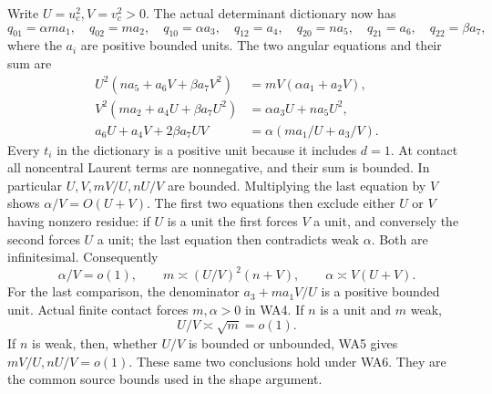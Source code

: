 Write \(U=u_c^2,V=v_c^2>0\). The actual determinant dictionary now has
\[
 q_{01}=\alpha m a_1,\quad q_{02}=ma_2,\quad
 q_{10}=\alpha a_3,\quad q_{12}=a_4,\quad
 q_{20}=na_5,\quad q_{21}=a_6,\quad q_{22}=\beta a_7,
 \tag{WA3}
\]
where the \(a_i\) are positive bounded units. The two angular equations
and their sum are
\[
\begin{aligned}
 U^2(na_5+a_6V+\beta a_7V^2)&=mV(\alpha a_1+a_2V),\\
 V^2(ma_2+a_4U+\beta a_7U^2)&=\alpha a_3U+na_5U^2,\\
 a_6U+a_4V+2\beta a_7UV
 &=\alpha(ma_1/U+a_3/V).
\end{aligned}\tag{WA4}
\]
Every \(t_i\) in the dictionary is a positive unit because it includes
\(d=1\). At contact all noncentral Laurent terms are nonnegative,
and their sum is bounded. In particular \(U,V,mV/U,nU/V\) are bounded.
Multiplying the last equation by \(V\) shows
\(\alpha/V=O(U+V)\). The first two equations then exclude either
\(U\) or \(V\) having nonzero residue: if \(U\) is a unit the first
forces \(V\) a unit, and conversely the second forces \(U\) a unit;
the last equation then contradicts weak \(\alpha\).
Both are infinitesimal. Consequently
\[
 \alpha/V=o(1),\qquad
 m\asymp (U/V)^2(n+V),\qquad
 \alpha\asymp V(U+V).
 \tag{WA5}
\]
For the last comparison, the denominator
\(a_3+ma_1V/U\) is a positive bounded unit. Actual finite contact
forces \(m,\alpha>0\) in WA4. If \(n\) is a unit and \(m\) weak,
\[
 U/V\asymp\sqrt m=o(1).
 \tag{WA6}
\]
If \(n\) is weak, then, whether \(U/V\) is bounded or unbounded,
WA5 gives \(mV/U,nU/V=o(1)\). These same two conclusions hold
under WA6. They are the common source bounds used in the shape argument.

